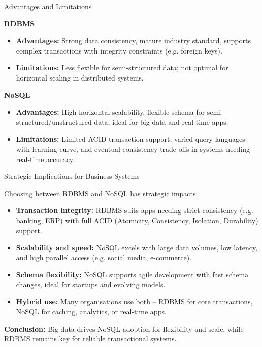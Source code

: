\documentclass[aspectratio=169, table]{beamer}
\begin{document}
\begin{frame}{Advantages and Limitations}
	\vspace{20pt}
	
	\textbf{RDBMS}
	\begin{itemize}
		\item \textbf{Advantages:} Strong data consistency, mature industry standard, supports complex transactions with integrity constraints (e.g. foreign keys).
		\item \textbf{Limitations:} Less flexible for semi-structured data; not optimal for horizontal scaling in distributed systems.
	\end{itemize}
	
	\vspace{10pt}
	\textbf{NoSQL}
	\begin{itemize}
		\item \textbf{Advantages:} High horizontal scalability, flexible schema for semi-structured/unstructured data, ideal for big data and real-time apps.
		\item \textbf{Limitations:} Limited ACID transaction support, varied query languages with learning curve, and eventual consistency trade-offs in systems needing real-time accuracy.
	\end{itemize}
	
\end{frame}

\begin{frame}{Strategic Implications for Business Systems}
	\vspace{20pt}
	
	Choosing between RDBMS and NoSQL has strategic impacts:
	
	\begin{itemize}
		\item \textbf{Transaction integrity:} RDBMS suits apps needing strict consistency (e.g. banking, ERP) with full ACID (Atomicity, Consistency, Isolation, Durability) support.
		\item \textbf{Scalability and speed:} NoSQL excels with large data volumes, low latency, and high parallel access (e.g. social media, e-commerce).
		\item \textbf{Schema flexibility:} NoSQL supports agile development with fast schema changes, ideal for startups and evolving models.
		\item \textbf{Hybrid use:} Many organisations use both – RDBMS for core transactions, NoSQL for caching, analytics, or real-time apps.
	\end{itemize}
	
	\textbf{Conclusion:} Big data drives NoSQL adoption for flexibility and scale, while RDBMS remains key for reliable transactional systems.
	
\end{frame}
\end{document}

